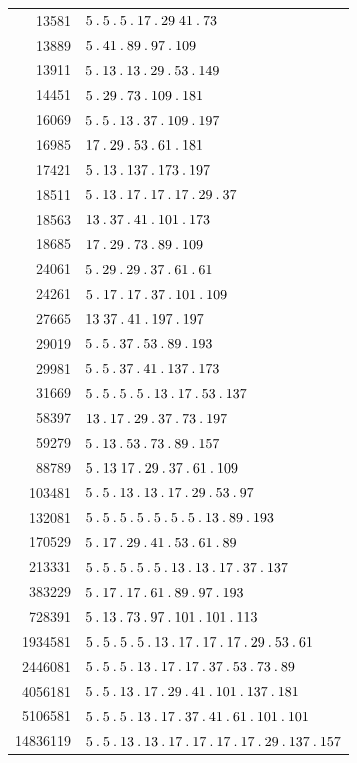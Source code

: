 \begin{longtable}{@{}r|l@{}}
13581 & $5\pdot 5\pdot 5\pdot 17\pdot 29\;41\pdot 73$\\
13889 & $5\pdot 41\pdot 89\pdot 97\pdot 109$\\
13911 & $5\pdot 13\pdot 13\pdot 29\pdot 53\pdot 149$\\
14451 & $5\pdot 29\pdot 73\pdot 109\pdot 181$\\
16069 & $5\pdot 5\pdot 13\pdot 37\pdot 109\pdot 197$\\
16985 & $17\pdot 29\pdot 53\pdot 61\pdot 181$\\
17421 & $5\pdot 13\pdot 137\pdot 173\pdot 197$\\
18511 & $5\pdot 13\pdot 17\pdot 17\pdot 17\pdot 29\pdot 37$\\
18563 & $13\pdot 37\pdot 41\pdot 101\pdot 173$\\
18685 & $17\pdot 29\pdot 73\pdot 89\pdot 109$\\
24061 & $5\pdot 29\pdot 29\pdot 37\pdot 61\pdot 61$\\
24261 & $5\pdot 17\pdot 17\pdot 37\pdot 101\pdot 109$\\
27665 & $13\;37\pdot 41\pdot 197\pdot 197$\\
29019 & $5\pdot 5\pdot 37\pdot 53\pdot 89\pdot 193$\\
29981 & $5\pdot 5\pdot 37\pdot 41\pdot 137\pdot 173$\\
31669 & $5\pdot 5\pdot 5\pdot 5\pdot 13\pdot 17\pdot 53\pdot 137$\\
58397 & $13\pdot 17\pdot 29\pdot 37\pdot 73\pdot 197$\\
59279 & $5\pdot 13\pdot 53\pdot 73\pdot 89\pdot 157$\\
88789 & $5\pdot 13\;17\pdot 29\pdot 37\pdot 61\pdot 109$\\
103481 & $5\pdot 5\pdot 13\pdot 13\pdot 17\pdot 29\pdot 53\pdot 97$\\
132081 & $5\pdot 5\pdot 5\pdot 5\pdot 5\pdot 5\pdot 5\pdot 13\pdot 89\pdot 193$\\
170529 & $5\pdot 17\pdot 29\pdot 41\pdot 53\pdot 61\pdot 89$\\
213331 & $5\pdot 5\pdot 5\pdot 5\pdot 5\pdot 13\pdot 13\pdot 17\pdot 37\pdot 137$\\
383229 & $5\pdot 17\pdot 17\pdot 61\pdot 89\pdot 97\pdot 193$\\
728391 & $5\pdot 13\pdot 73\pdot 97\pdot 101\pdot 101\pdot 113$\\
1934581 & $5\pdot 5\pdot 5\pdot 5\pdot 13\pdot 17\pdot 17\pdot 17\pdot 29\pdot 53\pdot 61$\\
2446081 & $5\pdot 5\pdot 5\pdot 13\pdot 17\pdot 17\pdot 37\pdot 53\pdot 73\pdot 89$\\
4056181 & $5\pdot 5\pdot 13\pdot 17\pdot 29\pdot 41\pdot 101\pdot 137\pdot 181$\\
5106581 & $5\pdot 5\pdot 5\pdot 13\pdot 17\pdot 37\pdot 41\pdot 61\pdot 101\pdot 101$\\
14836119 & $5\pdot 5\pdot 13\pdot 13\pdot 17\pdot 17\pdot 17\pdot 17\pdot 29\pdot 137\pdot 157$\\
\end{longtable}\endgroup
